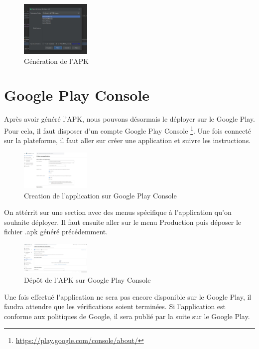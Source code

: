 \documentclass[UTF8]{EPURapport}
\begin{document}
\begin{figure}[h!]
\centering
  \includegraphics[width=0.3\textwidth]{images/generateAPK.jpg}
  \caption{Génération de l'APK}
  \label{fig:genapk}
\end{figure}

\section{Google Play Console}

Après avoir généré l'APK, nous pouvons désormais le déployer sur le Google Play. Pour cela, il faut disposer d'un compte Google Play Console \footnote{\url{https://play.google.com/console/about/}}. Une fois connecté sur la plateforme, il faut aller sur créer une application et suivre les instructions.

\begin{figure}[h!]
\centering
  \includegraphics[width=0.3\textwidth]{images/CreateAppConsole.JPG}
  \caption{Creation de l'application sur Google Play Console}
  \label{fig:createappconsole}
\end{figure}

On attérrit sur une section avec des menus spécifique à l'application qu'on souhaite déployer. Il faut ensuite aller sur le menu Production puis déposer le fichier .apk généré précédemment.

\begin{figure}[h!]
\centering
  \includegraphics[width=0.3\textwidth]{images/release.JPG}
  \caption{Dépôt de l'APK sur Google Play Console}
  \label{fig:depotapk}
\end{figure}

Une fois effectué l'application ne sera pas encore disponible sur le Google Play, il faudra attendre que les vérifications soient terminées. Si l'application est conforme aux politiques de Google, il sera publié par la suite sur le Google Play.
\end{document}
